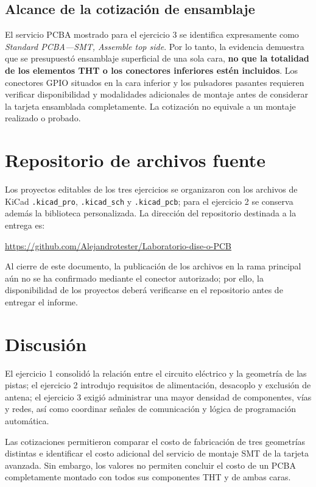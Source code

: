 \documentclass[journal,10pt]{IEEEtran}
\begin{document}
\subsection{Alcance de la cotización de ensamblaje}
El servicio PCBA mostrado para el ejercicio 3 se identifica expresamente como \emph{Standard PCBA---SMT, Assemble top side}. Por lo tanto, la evidencia demuestra que se presupuestó ensamblaje superficial de una sola cara, \textbf{no que la totalidad de los elementos THT o los conectores inferiores estén incluidos}. Los conectores GPIO situados en la cara inferior y los pulsadores pasantes requieren verificar disponibilidad y modalidades adicionales de montaje antes de considerar la tarjeta ensamblada completamente. La cotización no equivale a un montaje realizado o probado.

\section{Repositorio de archivos fuente}
Los proyectos editables de los tres ejercicios se organizaron con los archivos de KiCad \texttt{.kicad\_pro}, \texttt{.kicad\_sch} y \texttt{.kicad\_pcb}; para el ejercicio 2 se conserva además la biblioteca personalizada. La dirección del repositorio destinada a la entrega es:
\begin{center}
\footnotesize\url{https://github.com/Alejandrotester/Laboratorio-dise-o-PCB}
\end{center}
Al cierre de este documento, la publicación de los archivos en la rama principal aún no se ha confirmado mediante el conector autorizado; por ello, la disponibilidad de los proyectos deberá verificarse en el repositorio antes de entregar el informe.

\section{Discusión}
El ejercicio 1 consolidó la relación entre el circuito eléctrico y la geometría de las pistas; el ejercicio 2 introdujo requisitos de alimentación, desacoplo y exclusión de antena; el ejercicio 3 exigió administrar una mayor densidad de componentes, vías y redes, así como coordinar señales de comunicación y lógica de programación automática.

Las cotizaciones permitieron comparar el costo de fabricación de tres geometrías distintas e identificar el costo adicional del servicio de montaje SMT de la tarjeta avanzada. Sin embargo, los valores no permiten concluir el costo de un PCBA completamente montado con todos sus componentes THT y de ambas caras.
\end{document}
